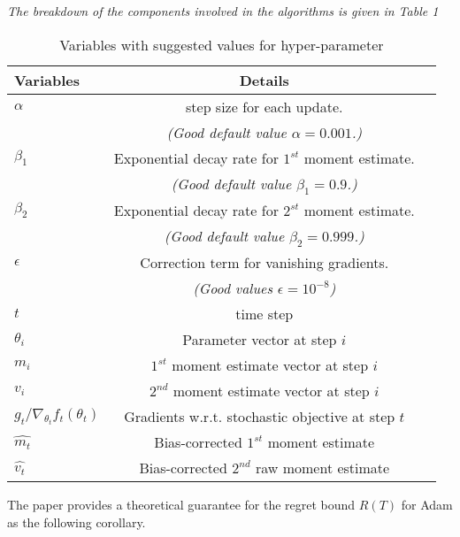 \documentclass[nohyperref]{article}
\theoremstyle{plain}
\theoremstyle{definition}
\theoremstyle{remark}
\begin{document}
 \textit{The breakdown of the components involved in the algorithms is given in Table 1} \\
 
 \begin{table}[!h]
\caption{Variables with suggested values for hyper-parameter}
\label{sample-table}
\vskip 0.15in
\begin{center}
\begin{small}
\begin{tabular}{lcr}
\toprule
Variables & Details \\
\midrule
$\alpha$    & step size for each update. \\
 & \textit{(Good default value $\alpha = 0.001$.)} \\
$\beta_{1}$ & Exponential decay rate for $1^{st}$ moment estimate. \\
 & \textit{(Good default value $\beta_{1} = 0.9$.)} \\
$\beta_{2}$ & Exponential decay rate for $2^{st}$ moment estimate. \\
 & \textit{(Good default value $\beta_{2} = 0.999$.)} \\
$\epsilon$ & Correction term for vanishing gradients. \\
 & \textit{(Good values $\epsilon = 10^{-8}$)} \\
$t$ & time step \\
$\theta_{i}$ & Parameter vector at step $i$ \\
$m_{i}$ & $1^{st}$ moment estimate vector at step $i$ \\
$v_{i}$ & $2^{nd}$ moment estimate vector at step $i$ \\
$g_{t}/ \nabla_{\theta_t}f_t(\theta_t)$ & Gradients w.r.t. stochastic objective at step $t$ \\
$\hat{m_{t}}$ & Bias-corrected $1^{st}$ moment estimate \\
$\hat{v_{t}}$ & Bias-corrected $2^{nd}$ raw moment estimate \\
\bottomrule
\end{tabular}
\end{small}
\end{center}
\vskip -0.1in
\end{table}

The paper provides a theoretical guarantee for the regret bound $R(T)$ for Adam as the following corollary.
\end{document}

